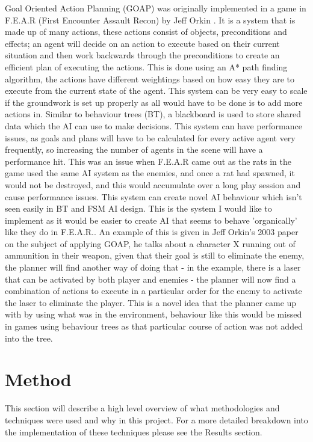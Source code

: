 \documentclass[11pt]{report}
\begin{document}
Goal Oriented Action Planning (GOAP) was originally implemented in a game in F.E.A.R (First Encounter Assault Recon) by Jeff Orkin \cite{goap}. It is a system that is made up of many actions, these actions consist of objects, preconditions and effects; an agent will decide on an action to execute based on their current situation and then work backwards through the preconditions to create an efficient plan of executing the actions. This is done using an A* path finding algorithm, the actions have different weightings based on how easy they are to execute from the current state of the agent. This system can be very easy to scale if the groundwork is set up properly as all would have to be done is to add more actions in. Similar to behaviour trees (BT), a blackboard is used to store shared data which the AI can use to make decisions. This system can have performance issues, as goals and plans will have to be calculated for every active agent very frequently, so increasing the number of agents in the scene will have a performance hit. This was an issue when F.E.A.R came out as the rats in the game used the same AI system as the enemies, and once a rat had spawned, it would not be destroyed, and this would accumulate over a long play session and cause performance issues.
This system can create novel AI behaviour which isn't seen easily in BT and FSM AI design. This is the system I would like to implement as it would be easier to create AI that seems to behave 'organically' like they do in F.E.A.R.. \cite{goapTommyTompson} An example of this is given in Jeff Orkin's 2003 paper on the subject of applying GOAP\cite{applyingGoap}, he talks about a character X running out of ammunition in their weapon, given that their goal is still to eliminate the enemy, the planner will find another way of doing that - in the example, there is a laser that can be activated by both player and enemies - the planner will now find a combination of actions to execute in a particular order for the enemy to activate the laser to eliminate the player. This is a novel idea that the planner came up with by using what was in the environment, behaviour like this would be missed in games using behaviour trees as that particular course of action was not added into the tree.

\chapter{Method}
This section will describe a high level overview of what methodologies and techniques were used and why in this project. For a more detailed breakdown into the implementation of these techniques please see the Results section.
\end{document}
